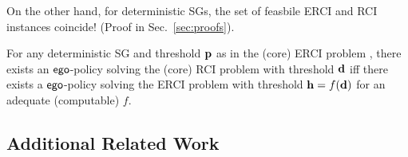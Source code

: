 

On the other hand, for deterministic SGs, the set of feasbile ERCI and
RCI instances coincide! (Proof in Sec.~\ref{sec:proofs}).
\begin{proposition}\label{prop:conservative}
  For any deterministic SG 
  and threshold $\mathbf{p}$ as in the (core) ERCI problem , there exists an $\mathsf{ego}$-policy solving
  the (core) RCI problem with threshold $\mathbf{d}$ iff there exists a
  $\mathsf{ego}$-policy solving the ERCI problem with threshold
  $\mathbf{h} = f(\mathbf{d})$ for an adequate (computable) $f$.
\end{proposition}

\subsection{Additional Related Work}
 
